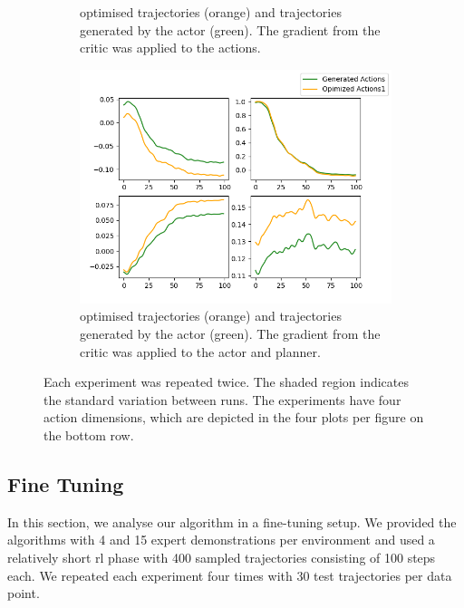 \begin{figure}[htbp]
\begin{subfigure}[t]{0.45\textwidth}
      \caption{optimised trajectories (orange) and trajectories generated by the actor (green). The gradient from the critic was applied to the actions.}
      \label{fig:direct_actions}
    \end{subfigure}
    \hfill
    \begin{subfigure}[t]{0.45\textwidth}
      \includegraphics[width=\textwidth]{images/Plan_vs_Actions/changes/plans_actor_0.png}
      \caption{optimised trajectories (orange) and trajectories generated by the actor (green). The gradient from the critic was applied to the actor and planner.}
      \label{fig:ac_pl_actions}
    \end{subfigure}
    \caption{Each experiment was repeated twice. The shaded region indicates the standard variation between runs. 
      The experiments have four action dimensions, which are depicted in the 
      four plots per figure on the bottom row.}
    \label{fig:action_vs_actor}
\end{figure}

\subsection{Fine Tuning}
\label{sec:fine_tuning}
In this section, we analyse our algorithm in a fine-tuning setup. We provided the algorithms with 4 and 15 expert demonstrations per 
environment and used a relatively short \ac{rl} phase with 400 sampled trajectories consisting of 100 steps each. We 
repeated each experiment four times with 30 test trajectories per data point.\\

